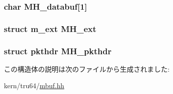 \label{structtru64_1_1mbuf_a7a1a7e5edab35557c5e2aa9c9bfe1d13}
\hypertarget{structtru64_1_1mbuf_a470cda2f7f80ca73f549ab2211c594fd}{
\subsubsection[{MH\_\-databuf}]{\setlength{\rightskip}{0pt plus 5cm}char {\bf MH\_\-databuf}\mbox{[}1\mbox{]}}}
\label{structtru64_1_1mbuf_a470cda2f7f80ca73f549ab2211c594fd}
\hypertarget{structtru64_1_1mbuf_af3e2ba05d43e480171c51bf862d27e7e}{
\subsubsection[{MH\_\-ext}]{\setlength{\rightskip}{0pt plus 5cm}struct {\bf m\_\-ext} {\bf MH\_\-ext}}}
\label{structtru64_1_1mbuf_af3e2ba05d43e480171c51bf862d27e7e}
\hypertarget{structtru64_1_1mbuf_adca58591f5f605b62a9b829b5ef735e4}{
\subsubsection[{MH\_\-pkthdr}]{\setlength{\rightskip}{0pt plus 5cm}struct {\bf pkthdr} {\bf MH\_\-pkthdr}}}
\label{structtru64_1_1mbuf_adca58591f5f605b62a9b829b5ef735e4}


この構造体の説明は次のファイルから生成されました:\begin{DoxyCompactItemize}
\item 
kern/tru64/\hyperlink{mbuf_8hh}{mbuf.hh}\end{DoxyCompactItemize}
